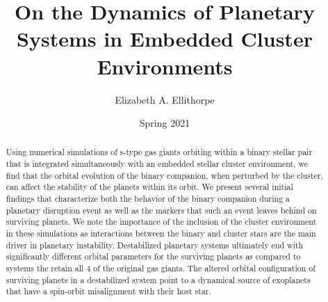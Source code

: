 \documentclass[manuscript]{aastex631}
\begin{document}
\title{On the Dynamics of Planetary Systems in Embedded Cluster Environments}
\author{Elizabeth A. Ellithorpe}
\date{Spring 2021}



\newpage
\begin{abstract}
    Using numerical simulations of s-type gas giants orbiting within a binary stellar pair that is integrated simultaneously with an embedded stellar cluster 
    environment, we find that the orbital evolution of the binary companion, when perturbed by the cluster, can affect the stability of the planets within its orbit.
    We present several initial findings that characterize both the behavior of the binary companion during a planetary 
    disruption event as well as the markers that such an event leaves behind on surviving planets. We note the importance of the inclusion
    of the cluster environment in these simulations as interactions between the binary and cluster stars are the main driver
    in planetary instability. Destabilized planetary systems ultimately end with significantly different orbital parameters for the 
    surviving planets as compared to systems the retain all 4 of the original gas giants. The altered orbital configuration of 
    surviving planets in a destabilized system point to a dynamical source of exoplanets that have a 
    spin-orbit misalignment with their host star. 
\end{abstract}
\end{document}
